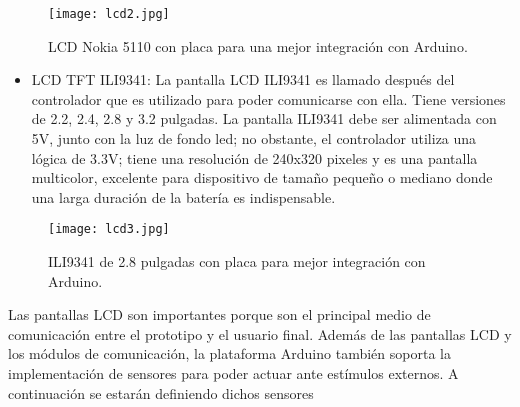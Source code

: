 \begin{figure}[H]
	\centering
	\texttt{[image: lcd2.jpg]}
	\caption{LCD Nokia 5110 con placa para una mejor integración con Arduino.}
\end{figure}

\begin{itemize}
	\item LCD TFT ILI9341: La pantalla LCD ILI9341 es llamado después del controlador que es utilizado para poder comunicarse con ella. Tiene versiones de 2.2, 2.4, 2.8 y 3.2 pulgadas. La pantalla ILI9341 debe ser alimentada con 5V, junto con la luz de fondo led; no obstante, el controlador utiliza una lógica de 3.3V; tiene una resolución de 240x320 pixeles y es una pantalla multicolor, excelente para dispositivo de tamaño pequeño o mediano donde una larga duración de la batería es indispensable\cite{ili9341}. 
\end{itemize}

\begin{figure}[H]
	\centering
	\texttt{[image: lcd3.jpg]}
	\caption{ILI9341 de 2.8 pulgadas con placa para mejor integración con Arduino.}
\end{figure} 

\par \noindent
Las pantallas LCD son importantes porque son el principal medio de comunicación entre el prototipo y el usuario final. Además de las pantallas LCD y los módulos de comunicación, la plataforma Arduino también soporta la implementación de sensores para poder actuar ante estímulos externos. A continuación se estarán definiendo dichos sensores

